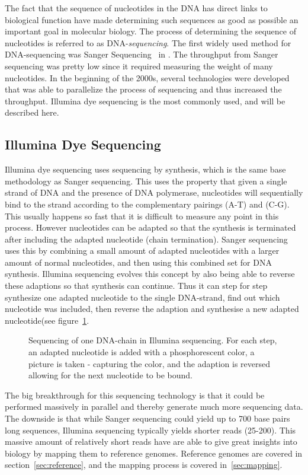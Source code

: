 The fact that the sequence of nucleotides in the DNA has direct links to biological function have made determining such sequences as good as possible an important goal in molecular biology.
The process of determining the sequence of nucleotides is referred to as DNA-\emph{sequencing}.
The first widely used method for DNA-sequencing was Sanger Sequencing~\cite{sanger} in .
The throughput from Sanger sequencing was pretty low since it required measuring the weight of many nucleotides. 
In the beginning of the 2000s, several technologies were developed that was able to parallelize the process of sequencing and thus increased the throughput. Illumina dye sequencing is the most commonly used, and will be described here.

\subsection{Illumina Dye Sequencing}
Illumina dye sequencing uses sequencing by synthesis, which is the same base methodology as Sanger sequencing. 
This uses the property that given a single strand of DNA and the presence of DNA polymerase, nucleotides will sequentially bind to the strand according to the complementary pairings (A-T) and (C-G).
This usually happens so fast that it is difficult to measure any point in this process.
However nucleotides can be adapted so that the synthesis is terminated after including the adapted nucleotide (chain termination).
Sanger sequencing uses this by combining a small amount of adapted nucleotides with a larger amount of normal nucleotides, and then using this combined set for DNA synthesis.
Illumina sequencing evolves this concept by also being able to reverse these adaptions so that synthesis can continue. Thus it can step for step synthesize one adapted nucleotide to the single DNA-strand, find out which nucleotide was included, then reverse the adaption and synthesise a new adapted nucleotide(see figure~\ref{fig:illumina}.
\begin{figure}
  \tikzpicture
  
  \endtikzpicture
  \caption{Sequencing of one DNA-chain in Illumina sequencing. For each step, an adapted nucleotide is added with a phosphorescent color, a picture is taken - capturing the color, and the adaption is reversed allowing for the next nucleotide to be bound.}
  \label{fig:illumina}
\end{figure}

The big breakthrough for this sequencing technology is that it could be performed massively in parallel and thereby generate much more sequencing data.
The downside is that while Sanger sequencing could yield up to 700 base pairs long sequences, Illumina sequencing typically yields shorter reads (25-200).
This massive amount of relatively short reads have are able to give great insights into biology by mapping them to reference genomes. Reference genomes are covered in section~\ref{sec:reference}, and the mapping process is covered in~\ref{sec:mapping}.

